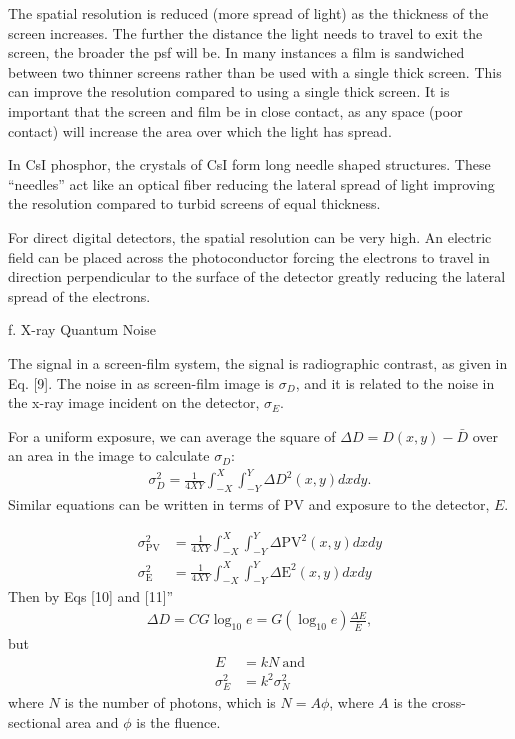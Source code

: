 \documentclass[mphy386-notes.tex]{subfiles}
\begin{document}
The spatial resolution is reduced (more spread of light) as the thickness of the
screen increases. The further the distance the light needs to travel to exit
the screen, the broader the psf will be. In many instances a film is sandwiched
between two thinner screens rather than be used with a single thick screen.
This can improve the resolution compared to using a single thick screen. It is
important that the screen and film be in close contact, as any space (poor
contact) will increase the area over which the light has spread.

In CsI phosphor, the crystals of CsI form long needle shaped structures. These
“needles” act like an optical fiber reducing the lateral spread of light
improving the resolution compared to turbid screens of equal thickness.

For direct digital detectors, the spatial resolution can be very high. An
electric field can be placed across the photoconductor forcing the electrons to
travel in direction perpendicular to the surface of the detector greatly
reducing the lateral spread of the electrons.

f. X-ray Quantum Noise

The signal in a screen-film system, the signal is radiographic contrast, as
given in Eq. [9]. The noise in as screen-film image is $\sigma_D$, and it is
related to the noise in the x-ray image incident on the detector, $\sigma_E$.

For a uniform exposure, we can average the square of $\Delta D = D(x,y) - \bar{D}$
over an area in the image to calculate $\sigma_D$:
\begin{align}
  \sigma_D^2 = \frac{1}{4XY}\int_{-X}^{X}\int_{-Y}^{Y}\Delta D^2(x,y)dxdy.
\end{align}
Similar equations can be written in terms of PV and exposure to the detector, $E$. 

\begin{align}
  \sigma_{\text{PV}}^2 &= \frac{1}{4XY}\int_{-X}^{X}\int_{-Y}^{Y}\Delta \text{PV}^2(x,y)dxdy\\
    \sigma_{\text{E}}^2 &= \frac{1}{4XY}\int_{-X}^{X}\int_{-Y}^{Y}\Delta \text{E}^2(x,y)dxdy
\end{align}
Then by Eqs [10] and [11]''
\begin{align}
  \Delta D = CG\log_{10}e = G(\log_{10}e)\frac{\Delta E}{\bar{E}},
\end{align}
but
\begin{align}
  E &= kN \ \text{and}\\
  \sigma_E^2 &= k^2\sigma_N^2
\end{align}
where $N$ is the number of photons, which is $N = A\phi$, where $A$ is the
cross-sectional area and $\phi$ is the fluence.
\end{document}
